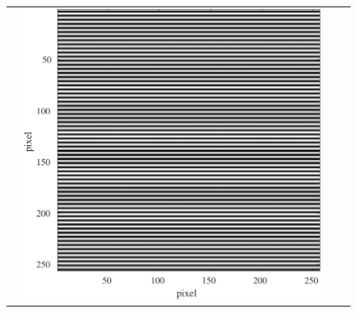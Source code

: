 \begin{figure}[H]
\begin{tabularx}{\textwidth}{p{}CCC}
\begin{minipage}{.25\textwidth}
        \end{minipage}     &
        \begin{minipage}{.25\textwidth}
            \centering
            \includegraphics[width=.9\textwidth,keepaspectratio]{../../Figures/08_23_img64.pdf}
        \end{minipage}                                                                 \\


\end{tabularx}
\end{figure}
